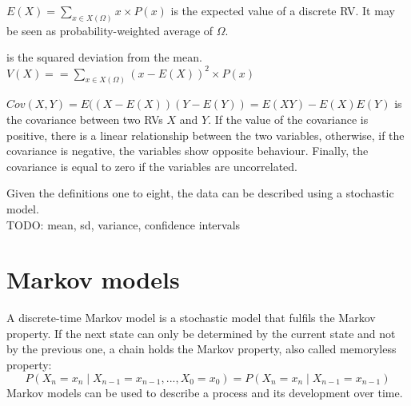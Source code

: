 \begin{definition}[Expectation]
$E(X) = \sum_{x \in X(\Omega)}{x \times P(x)}$ is the expected value of a discrete \ac{RV}. It may be seen as probability-weighted average of $\Omega$\cite{Probability}.
\end{definition}
\begin{definition}[Variance]
is the squared deviation from the mean. $V(X) = = \sum_{x \in X(\Omega)}{(x-E(X))^2 \times P(x)}$\cite{Probability}
\end{definition}
\begin{definition}[Covariance]
$Cov(X,Y) = E((X-E(X))(Y-E(Y)) = E(XY)-E(X)E(Y)$ is the covariance between two \acp{RV} $X$ and $Y$. If the value of the covariance is positive, there is a linear relationship between the two variables, otherwise, if the covariance is negative, the variables show opposite behaviour. Finally, the covariance is equal to zero if the variables are uncorrelated\cite{ProbDistri}.
\end{definition}
Given the definitions one to eight, the data can be described using a stochastic model.\\
TODO: mean, sd, variance, confidence intervals

\section{Markov models} 
\label{section:MM}
A discrete-time Markov model is a stochastic model that fulfils the Markov property. If the next state can only be determined by the current state and not by the previous one, a chain holds the Markov property, also called memoryless property\cite{Probability}:
\begin{equation}
P(X_n = x_n \mid X_{n-1} = x_{n-1}, ..., X_0 = x_0) = P(X_n = x_n \mid X_{n-1} = x_{n-1})
\end{equation}
Markov models can be used to describe a process and its development over time.\\

